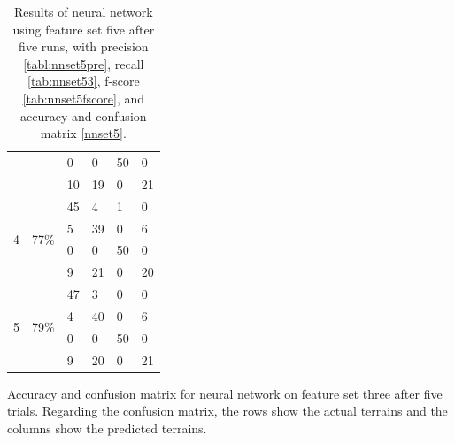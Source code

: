 \documentclass[USenglish]{ifimaster}  %
\begin{document}
\begin{table}[h]
\begin{subtable}[h]{1\textwidth}
\begin{tabular}{@{}llllll@{}}
			\multicolumn{1}{l|}{} & \multicolumn{1}{l|}{} & \multicolumn{1}{l|}{0} & \multicolumn{1}{l|}{0} & \multicolumn{1}{l|}{50} & 0 \\ \cmidrule(l){3-6} 
			\multicolumn{1}{l|}{} & \multicolumn{1}{l|}{} & \multicolumn{1}{l|}{10} & \multicolumn{1}{l|}{19} & \multicolumn{1}{l|}{0} & 21 \\ \midrule
			\multicolumn{1}{l|}{\multirow{4}{*}{4}} & \multicolumn{1}{l|}{\multirow{4}{*}{77\%}} & \multicolumn{1}{l|}{45} & \multicolumn{1}{l|}{4} & \multicolumn{1}{l|}{1} & 0 \\ \cmidrule(l){3-6} 
			\multicolumn{1}{l|}{} & \multicolumn{1}{l|}{} & \multicolumn{1}{l|}{5} & \multicolumn{1}{l|}{39} & \multicolumn{1}{l|}{0} & 6 \\ \cmidrule(l){3-6} 
			\multicolumn{1}{l|}{} & \multicolumn{1}{l|}{} & \multicolumn{1}{l|}{0} & \multicolumn{1}{l|}{0} & \multicolumn{1}{l|}{50} & 0 \\ \cmidrule(l){3-6} 
			\multicolumn{1}{l|}{} & \multicolumn{1}{l|}{} & \multicolumn{1}{l|}{9} & \multicolumn{1}{l|}{21} & \multicolumn{1}{l|}{0} & 20 \\ \midrule
			\multicolumn{1}{l|}{\multirow{4}{*}{5}} & \multicolumn{1}{l|}{\multirow{4}{*}{79\%}} & \multicolumn{1}{l|}{47} & \multicolumn{1}{l|}{3} & \multicolumn{1}{l|}{0} & 0 \\ \cmidrule(l){3-6} 
			\multicolumn{1}{l|}{} & \multicolumn{1}{l|}{} & \multicolumn{1}{l|}{4} & \multicolumn{1}{l|}{40} & \multicolumn{1}{l|}{0} & 6 \\ \cmidrule(l){3-6} 
			\multicolumn{1}{l|}{} & \multicolumn{1}{l|}{} & \multicolumn{1}{l|}{0} & \multicolumn{1}{l|}{0} & \multicolumn{1}{l|}{50} & 0 \\ \cmidrule(l){3-6} 
			\multicolumn{1}{l|}{} & \multicolumn{1}{l|}{} & \multicolumn{1}{l|}{9} & \multicolumn{1}{l|}{20} & \multicolumn{1}{l|}{0} & 21 \\ \bottomrule
		\end{tabular}
		\caption{Accuracy and confusion matrix for neural network on feature set three after five trials. Regarding the confusion matrix, the rows show the actual terrains and the columns show the predicted terrains.}
		\label{nnset5}
	\end{subtable}
\caption[Results of Neural network on feature set five]{Results of neural network using feature set five after five runs, with precision \ref{tabl:nnset5pre}, recall \ref{tab:nnset53}, f-score \ref{tab:nnset5fscore}, and accuracy and confusion matrix \ref{nnset5}.}
\label{tab:nn5}
\end{table}
\FloatBarrier
\newpage
	
\end{document}
